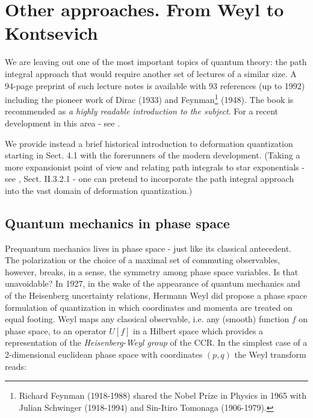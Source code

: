 \documentclass[12pt]{article}
\begin{document}
\bigskip

\section{Other approaches. From Weyl to Kontsevich}
\setcounter{equation}{0}
\renewcommand\theequation{\thesection.\arabic{equation}}

We are leaving out one of the most important topics of quantum theory: the path integral approach that would require another set
of lectures of a similar size. A 94-page preprint of such lecture notes is available \cite{Gr} with 93 references (up to 1992)
including the pioneer work of Dirac (1933) and Feynman\footnote{Richard Feynman (1918-1988) shared the Nobel Prize in Physics in 1965
with Julian Schwinger (1918-1994) and Sin-Itiro Tomonaga (1906-1979).} (1948). The book \cite{ZJ} is recommended as {\it a highly 
readable introduction to the subject}. For a recent development in this area - see \cite{W10}. 

We provide instead a brief historical introduction to deformation quantization starting in Sect. 4.1 with the forerunners of the
modern development. (Taking a more expansionist point of view and relating path integrals to star exponentials - see \cite{S98},
Sect. II.3.2.1 - one can pretend to incorporate the path integral approach into the vast domain of deformation quantization.)

\smallskip

\subsection{Quantum mechanics in phase space}

Prequantum mechanics lives in phase space - just like its classical antecedent. The polarization or the choice of a maximal set
of commuting observables, however, breaks, in a sense, the symmetry among phase space variables. Is that unavoidable? In 1927, in
the wake of the appearance of quantum mechanics and of the Heisenberg uncertainty relations, Hermann Weyl \cite{We} did propose 
a phase space formulation of quantization in which coordinates and momenta are treated on equal footing. Weyl maps any classical 
observable, i.e. any (smooth) function $f$ on phase space, to an operator $U[f]$ in a Hilbert 
space which provides a representation of the {\it Heisenberg-Weyl group} of the CCR. In the simplest case of a 2-dimensional
euclidean phase space with coordinates $(p, q)$ the Weyl transform reads:
\end{document}
